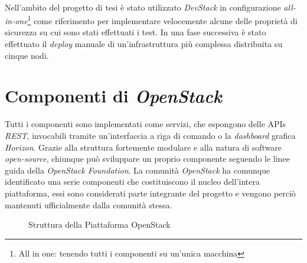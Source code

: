 \paragraph{}
Nell'ambito del progetto di tesi è stato utilizzato \textit{DevStack} in configurazione \textit{all-in-one}\footnote{All in one: tenendo tutti i componenti su un'unica macchina} come riferimento per implementare velocemente alcune delle proprietà di sicurezza su cui sono stati effettuati i test.
In una fase successiva è stato effettuato il \textit{deploy} manuale di un'infrastruttura più complessa distribuita su cinque nodi.

\section{Componenti di \textit{OpenStack}}
Tutti i componenti sono implementati come servizi, che espongono delle APIs \textit{REST}, invocabili tramite un'interfaccia a riga di comando o la \textit{dashboard} grafica \textit{Horizon}.
Grazie alla struttura fortemente modulare e alla natura di software \textit{open-source}, chiunque può sviluppare un proprio componente seguendo le linee guida della \textit{OpenStack Foundation}\cite{GuidelinesOpenstackHacking}.
La comunità \textit{OpenStack} ha comunque identificato una serie componenti che costituiscono il nucleo dell'intera piattaforma, essi sono considerati parte integrante del progetto e vengono perciò mantenuti ufficialmente dalla comunità stessa.
\begin{figure}[H]
\centering
{}
\caption{Struttura della Piattaforma OpenStack\cite{OpenstackDiagram}}\label{openstacksw}
\end{figure}
